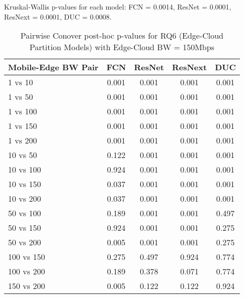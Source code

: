 \begin{table}[h]
\centering
\caption{Pairwise Conover post-hoc p-values for RQ6 (Edge-Cloud Partition Models) with Edge-Cloud BW = 150Mbps}
\label{tab:conover_edge_cloud_partition_ec150}
\smallskip
Kruskal-Wallis p-values for each model: FCN = 0.0014, ResNet = 0.0001, ResNext = 0.0001, DUC = 0.0008.

\begin{tabular}{lcccc}
\toprule
Mobile-Edge BW Pair & FCN & ResNet & ResNext & DUC \\
\midrule
1 vs 10 & 0.001 & 0.001 & 0.001 & 0.001 \\
1 vs 50 & 0.001 & 0.001 & 0.001 & 0.001 \\
1 vs 100 & 0.001 & 0.001 & 0.001 & 0.001 \\
1 vs 150 & 0.001 & 0.001 & 0.001 & 0.001 \\
1 vs 200 & 0.001 & 0.001 & 0.001 & 0.001 \\
10 vs 50 & 0.122 & 0.001 & 0.001 & 0.001 \\
10 vs 100 & 0.924 & 0.001 & 0.001 & 0.001 \\
10 vs 150 & 0.037 & 0.001 & 0.001 & 0.001 \\
10 vs 200 & 0.037 & 0.001 & 0.001 & 0.001 \\
50 vs 100 & 0.189 & 0.001 & 0.001 & 0.497 \\
50 vs 150 & 0.924 & 0.001 & 0.001 & 0.275 \\
50 vs 200 & 0.005 & 0.001 & 0.001 & 0.275 \\
100 vs 150 & 0.275 & 0.497 & 0.924 & 0.774 \\
100 vs 200 & 0.189 & 0.378 & 0.071 & 0.774 \\
150 vs 200 & 0.005 & 0.122 & 0.122 & 0.924 \\
\bottomrule
\end{tabular}
\end{table}

